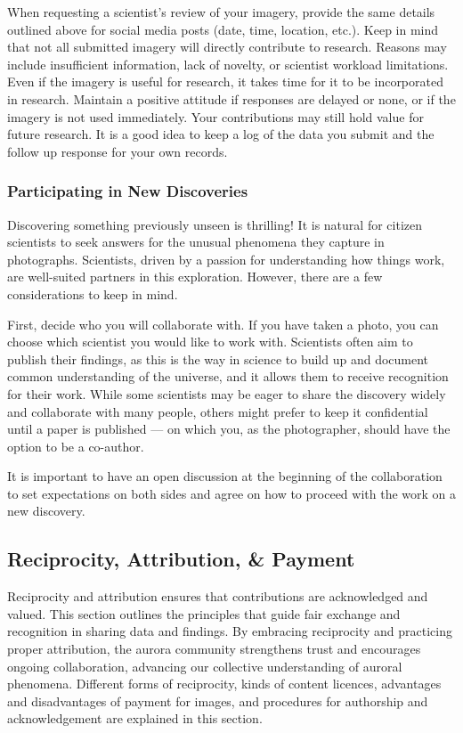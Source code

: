 \documentclass{article}
\newcommand{\contributed}[1]{%
    \par\noindent
    \begingroup
    \setlength{\leftskip}{1em}%
    \itshape
    Contributors: #1
    \par
    \endgroup
    \vspace{0.5em}
}
\begin{document}
When requesting a scientist's review of your imagery, provide the same details outlined above for social media posts (date, time, location, etc.). Keep in mind that not all submitted imagery will directly contribute to research. Reasons may include insufficient information, lack of novelty, or scientist workload limitations. Even if the imagery is useful for research, it takes time for it to be incorporated in research. Maintain a positive attitude if responses are delayed or none, or if the imagery is not used immediately. Your contributions may still hold value for future research. It is a good idea to keep a log of the data you submit and the follow up response for your own records.


\subsubsection{Participating in New Discoveries}
Discovering something previously unseen is thrilling! It is natural for citizen scientists to seek answers for the unusual phenomena they capture in photographs. Scientists, driven by a passion for understanding how things work, are well-suited partners in this exploration. However, there are a few considerations to keep in mind.

First, decide who you will collaborate with. If you have taken a photo, you can choose which scientist you would like to work with. Scientists often aim to publish their findings, as this is the way in science to build up and document common understanding of the universe, and it allows them to receive recognition for their work. While some scientists may be eager to share the discovery widely and collaborate with many people, others might prefer to keep it confidential until a paper is published — on which you, as the photographer, should have the option to be a co-author. 

It is important to have an open discussion at the beginning of the collaboration to set expectations on both sides and agree on how to proceed with the work on a new discovery.

\subsection{Reciprocity, Attribution, \& Payment} 

Reciprocity and attribution ensures that contributions are acknowledged and valued. This section outlines the principles that guide fair exchange and recognition in sharing data and findings. By embracing reciprocity and practicing proper attribution, the aurora community strengthens trust and encourages ongoing collaboration, advancing our collective understanding of auroral phenomena. Different forms of reciprocity, kinds of content licences, advantages and disadvantages of payment for images, and procedures for authorship and acknowledgement are explained in this section.
\end{document}
